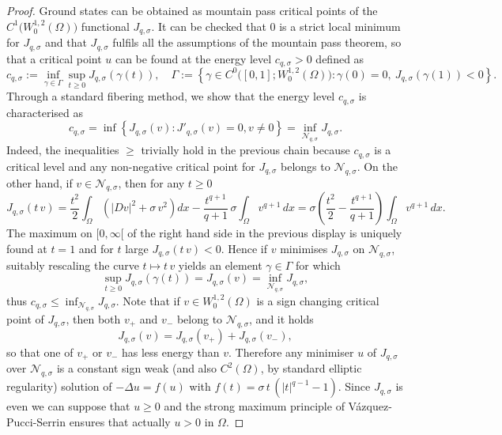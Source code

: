\documentclass[12pt]{amsart}
\numberwithin{equation}{section}
\theoremstyle{plain}
\theoremstyle{plain}
\theoremstyle{plain}
\theoremstyle{definition}
\renewcommand{\le}{\leqslant}
\renewcommand{\ge}{\geqslant}
\begin{document}
 \begin{proof}
 Ground states can be obtained as mountain pass critical points of the $C^1\big(W^{1, 2}_0(\Omega)\big)$ functional $J_{q, \sigma}$.
It can be checked that $0$ is a strict local minimum for $J_{q, \sigma}$ and that $J_{q, \sigma}$ fulfils all the assumptions of the mountain pass theorem, so that a critical point $u$ can be found at the energy level $c_{q, \sigma}>0$ defined as 
\[
c_{q, \sigma}:=\inf_{\gamma\in \Gamma} \sup_{t\ge 0}J_{q, \sigma}(\gamma(t)), \quad \Gamma:=\left\{\gamma\in C^0\big([0, 1]; W^{1,2}_0(\Omega)\big):\gamma(0)=0,\ J_{q,\sigma}(\gamma(1))<0\right\}.
\]
Through a standard fibering method, we show that the energy level $c_{q, \sigma}$ is characterised as
\begin{equation}\label{eq_def_cqsigma}
c_{q, \sigma}=\inf\left\{J_{q, \sigma}(v): J'_{q, \sigma}(v)=0, v\neq 0\right\}=\inf_{{\mathcal N}_{q, \sigma}}J_{q, \sigma}.
\end{equation}
Indeed, the inequalities $\ge$ trivially hold in the previous chain because $c_{q, \sigma}$ is a critical level and any non-negative critical point for $J_{q, \sigma}$ belongs to ${\mathcal N}_{q, \sigma}$. 
On the other hand, if $v\in {\mathcal N}_{q, \sigma}$, then for any $t\ge 0$
\[
J_{q, \sigma}(t\, v)= \frac{t^2}{2}\int_\Omega \left( |D v|^2+\sigma \, v^2\right)
 dx-\frac{t^{q+1}}{q+1}\, \sigma \int_\Omega v^{q+1}\, dx=\sigma \left(\frac{t^2}{2}-\frac{t^{q+1}}{q+1}\right)\int_\Omega v^{q+1}\, dx.
\]
The maximum on $[0, \infty[$ of the right hand side in the previous display is uniquely found at $t=1$ and for $t$ large $J_{q, \sigma}(t\, v)<0$. 
Hence if $v$ minimises $J_{q, \sigma}$ on ${\mathcal N}_{q, \sigma}$, suitably rescaling the curve $t\mapsto t\, v$ yields an element $\gamma\in \Gamma$ for which 
\[
\sup_{t\ge 0} J_{q, \sigma}(\gamma(t))=J_{q, \sigma}(v)=\inf_{\mathcal{N}_{q, \sigma}} J_{q, \sigma},
\]
thus 
$c_{q, \sigma}\le \inf_{\mathcal{N}_{q, \sigma}} J_{q, \sigma}.$ 
Note that if $v\in W^{1,2}_0(\Omega)$ is a sign changing critical point of $J_{q, \sigma}$, then both $v_+$ and $v_-$ belong to ${\mathcal N}_{q, \sigma}$, and it holds
\[
J_{q, \sigma}(v)=J_{q, \sigma}(v_+) + J_{q, \sigma}(v_-),
\]
so that one of $v_+$ or $v_-$ has less energy than $v$. 
Therefore any minimiser $u$ of $J_{q, \sigma}$ over ${\mathcal N}_{q, \sigma}$ is a constant sign weak (and also $C^2(\Omega)$, by standard elliptic regularity) solution of $-\Delta u=f(u)$ with $f(t)=\sigma\, t\, (|t|^{q-1}-1)$. 
Since $J_{q, \sigma}$ is even we can suppose that $u\ge 0$ and the strong maximum principle of Vázquez-Pucci-Serrin \cite[Theorem 1.1.1]{PuSe07} ensures that actually $u>0$ in $\Omega$. 
\end{proof}
 
\end{document}

